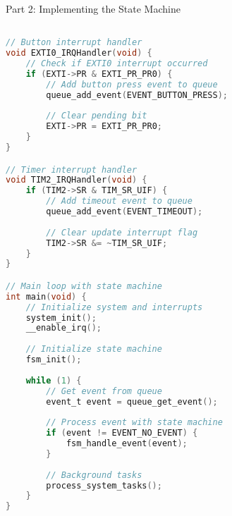 \begin{KR}{Part 2: Implementing the State Machine}
\begin{lstlisting}[language=C, style=basesmol]

// Button interrupt handler
void EXTI0_IRQHandler(void) {
    // Check if EXTI0 interrupt occurred
    if (EXTI->PR & EXTI_PR_PR0) {
        // Add button press event to queue
        queue_add_event(EVENT_BUTTON_PRESS);
        
        // Clear pending bit
        EXTI->PR = EXTI_PR_PR0;
    }
}

// Timer interrupt handler
void TIM2_IRQHandler(void) {
    if (TIM2->SR & TIM_SR_UIF) {
        // Add timeout event to queue
        queue_add_event(EVENT_TIMEOUT);
        
        // Clear update interrupt flag
        TIM2->SR &= ~TIM_SR_UIF;
    }
}

// Main loop with state machine
int main(void) {
    // Initialize system and interrupts
    system_init();
    __enable_irq();
    
    // Initialize state machine
    fsm_init();
    
    while (1) {
        // Get event from queue
        event_t event = queue_get_event();
        
        // Process event with state machine
        if (event != EVENT_NO_EVENT) {
            fsm_handle_event(event);
        }
        
        // Background tasks
        process_system_tasks();
    }
}
\end{lstlisting}
\end{KR}

